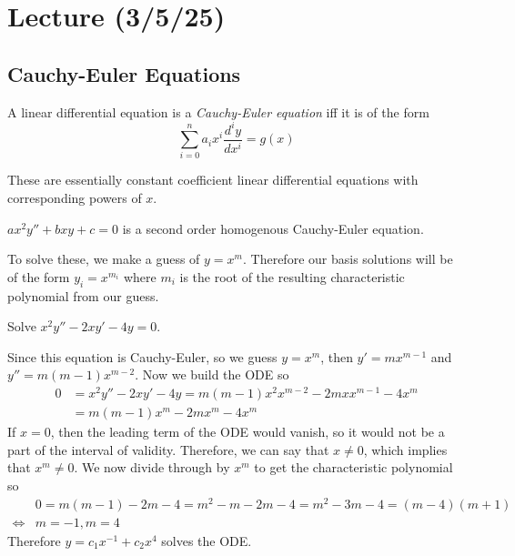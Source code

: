 \documentclass[notes]{subfiles}
\begin{document}
\setcounter{section}{13}
\section{Lecture (3/5/25)}

\subsection{Cauchy-Euler Equations}
\begin{definition}
    A linear differential equation is a \textit{Cauchy-Euler equation} iff it is of the form
    \[
        \sum_{i = 0}^n a_i x^i \frac{d^i y}{dx^i} = g(x)
    \]
\end{definition}
These are essentially constant coefficient linear differential equations with corresponding powers of $x$.

\begin{example}
    $ax^2 y'' + bxy + c = 0$ is a second order homogenous Cauchy-Euler equation.
\end{example}

To solve these, we make a guess of $y = x^m$. Therefore our basis solutions will be of the form $y_i = x^{m_i}$ where $m_i$ is the root of the resulting characteristic polynomial from our guess.

\begin{exercise}
    Solve $x^2y'' - 2xy' - 4y = 0$.
\end{exercise}
\begin{solution}
    Since this equation is Cauchy-Euler, so we guess $y = x^m$, then $y' = mx^{m - 1}$ and $y'' = m(m - 1)x^{m - 2}$.
    Now we build the ODE so
    \begin{align*}
        0
        &= x^2y'' - 2xy' - 4y
        = m(m - 1)x^2x^{m - 2} - 2mxx^{m - 1} - 4x^m \\
        &= m(m - 1)x^m - 2mx^m - 4x^m
    \end{align*}
    If $x = 0$, then the leading term of the ODE would vanish, so it would not be a part of the interval of validity. Therefore, we can say that $x \neq 0$, which implies that $x^m \neq 0$. We now divide through by $x^m$ to get the characteristic polynomial so
    \begin{align*}
        &0 = m(m - 1) - 2m - 4 = m^2 - m - 2m - 4 = m^2 - 3m - 4 = (m - 4)(m + 1) \\
        \iff& m = -1, m = 4
    \end{align*}
    Therefore $y = c_1x^{-1} + c_2x^4$ solves the ODE.
\end{solution}
\end{document}
